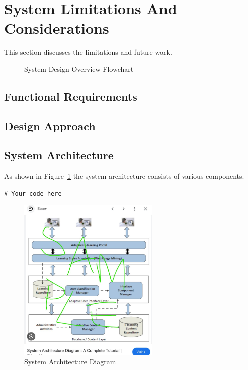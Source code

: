 \section{System Limitations And Considerations}
This section discusses the limitations and future work.

\begin{figure}[H]
    \centering
    \scalebox{0.8}{ %
        
    }
    \caption{System Design Overview Flowchart}
    \label{fig:decriptiveLabel4} %
\end{figure}

\subsection{Functional Requirements}

\subsection{Design Approach}

\subsection{System Architecture}
As shown in Figure~\ref{fig:decriptiveLabel4} the system architecture consists of various components.

\begin{lstlisting}[style=cstyle, caption=System Architecture Code Example, label=lst:SystemArchitecture18]
# Your code here
\end{lstlisting}

\begin{figure}[htbp] %
    \centering
    \includegraphics[width=0.6\textwidth]{figures/results/system_architecture.jpg}
    \caption{System Architecture Diagram}
    \label{fig:system-architecture26}
\end{figure}